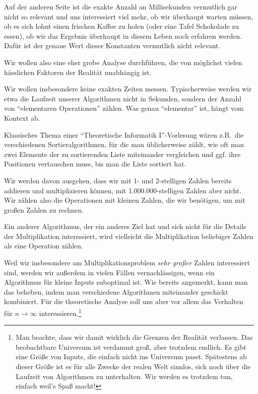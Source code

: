 \begin{remark}
    Auf der anderen Seite ist die exakte Anzahl an Millisekunden vermutlich gar nicht so relevant und uns interessiert viel mehr, ob wir überhaupt warten müssen, ob es sich lohnt einen frischen Kaffee zu holen (oder eine Tafel Schokolade zu essen), ob wir das Ergebnis überhaupt in diesem Leben noch erfahren werden. Dafür ist der genaue Wert dieser Konstanten vermutlich nicht relevant.

    \medskip
    Wir wollen also eine eher grobe Analyse durchführen, die von möglichst vielen hässlichen Faktoren der Realität unabhängig ist.

    Wir wollen insbesondere keine exakten Zeiten messen. Typischerweise werden wir etwa die Laufzeit unserer Algorithmen nicht in Sekunden, sondern der Anzahl von \enquote{elementaren Operationen} zählen. Was genau \enquote{elementar} ist, hängt vom Kontext ab.

    \smallskip
    Klassisches Thema einer \enquote{Theoretische Informatik I}-Vorlesung wären z.B.\ die verschiedenen Sortieralgorithmen, für die man üblicherweise zählt, wie oft man zwei Elemente der zu sortierenden Liste miteinander vergleichen und ggf. ihre Positionen vertauschen muss, bis man die Liste sortiert hat.

    \smallskip
    Wir werden davon ausgehen, dass wir mit 1- und 2-stelligen Zahlen bereits addieren und multiplizieren können, mit 1.000.000-stelligen Zahlen aber nicht. Wir zählen also die Operationen mit kleinen Zahlen, die wir benötigen, um mit großen Zahlen zu rechnen.

    \smallskip
    Ein anderer Algorithmus, der ein anderes Ziel hat und sich nicht für die Details der Multiplikation interessiert, wird vielleicht die Multiplikation beliebiger Zahlen als eine Operation zählen.
\end{remark}

\begin{remark}
    Weil wir insbesondere am Multiplikationsproblem \emph{sehr großer} Zahlen interessiert sind, werden wir außerdem in vielen Fällen vernachlässigen, wenn ein Algorithmus für kleine Inputs suboptimal ist. Wie bereits angemerkt, kann man das beheben, indem man verschiedene Algorithmen miteinander geschickt kombiniert. Für die theoretische Analyse soll uns aber vor allem das Verhalten für $n\to\infty$ interessieren.\footnote{Man beachte, dass wir damit wirklich die Grenzen der Realität verlassen. Das beobachtbare Universum ist verdammt groß\cite{adams1979hitchhikersguide}, aber trotzdem endlich. Es gibt eine Größe von Inputs, die einfach nicht ins Universum passt. Spätestens ab dieser Größe ist es für alle Zwecke der realen Welt sinnlos, sich noch über die Laufzeit von Algorithmen zu unterhalten. Wir werden es trotzdem tun, einfach weil's Spaß macht!}
\end{remark}

